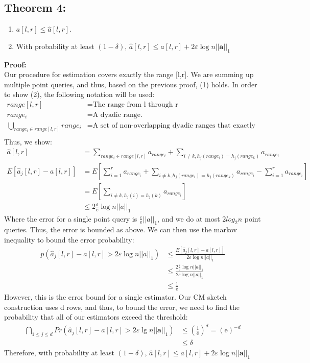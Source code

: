 \documentclass[11pt]{article}
\begin{document}
{\subsection{Theorem 4: }
\begin{enumerate}[label=\textnormal{(\arabic*)}]
    \item $a[l,r] \leq \hat a[l,r]$.\\
    \item With probability at least $(1-\delta)$, $\hat a[l,r] \leq a[l,r] + 2\varepsilon \log n ||\bm{a}||_1$
\end{enumerate}
    \textbf{Proof:}\\
Our procedure for estimation covers exactly the range [l,r]. We are summing up multiple point queries, and thus, based on the previous proof, (1) holds. In order to show (2), the following notation will be used:
\begin{align*}
    range[l,r] &= \text{The range from l through r}\\
    range_i &= \text{A dyadic range.}\\
    \bigcup_{range_i \in range[l,r]} range_i &= \text{A set of non-overlapping dyadic ranges that exactly cover range[l,r]}\\
\end{align*}
Thus, we show:
\begin{align*}
    \hat a[l,r] &= \sum_{range_i \in range[l,r]} a_{range_i} + \sum_{i \neq k, h_j(range_i) = h_j(range_k)} a_{range_i}\\
    E[\hat a_j[l,r] - a[l,r]] &= E[\sum_{i=1}^r a_{range_i} + \sum_{i \neq k, h_j(range_i)=h_j(range_k)} a_{range_i} - \sum_{i=1}^r a_{range_i}]\\
    &= E[\sum_{i \neq k, h_j(i)=h_j(k)} a_{range_i}]\\
    &\leq 2\frac{\varepsilon}{\mathrm e} \log n ||a||_1
\end{align*}
Where the error for a single point query is $\frac{\varepsilon}{\mathrm e}||a||_1$, and we do at most $2log_2n$ point queries. Thus, the error is bounded as above. We can then use the markov inequality to bound the error probability:
\begin{align*}
    p(\hat a_j[l,r] - a[l,r] > 2\varepsilon \log n ||a||_1) &\leq \frac{E[\hat a_j[l,r] - a[l,r]]}{2\varepsilon \log n||a||_1}\\
    &\leq \frac{2\frac{\varepsilon}{\mathrm e}\log n ||a||_1}{2\varepsilon \log n ||a||_1}\\
    &\leq \frac{1}{\mathrm e}
\end{align*}
However, this is the error bound for a single estimator. Our CM sketch construction uses d rows, and thus, to bound the error, we need to find the probability that all of our estimators exceed the threshold:
\begin{align*}
    \bigcap_{1\leq j \leq d} Pr(\hat a_j[l,r] - a[l,r] > 2\varepsilon \lg n ||\bm{a}||_1) &\leq \left(\frac{1}{\mathrm e}\right)^d = (\mathrm e)^{-d}\\
    &\leq \delta
\end{align*}
Therefore, with probability at least $(1-\delta)$, $\hat a[l,r] \leq a[l,r] + 2\varepsilon \log n ||\bm{a}||_1$
}
\end{document}

